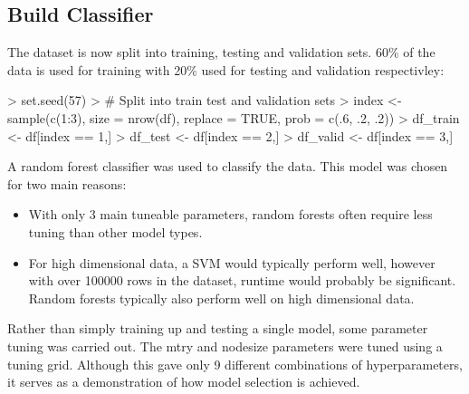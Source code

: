\documentclass[10pt]{article}
\begin{document}
\subsection{Build Classifier}
The dataset is now split into training, testing and validation sets. 60\% of the data is used for training with 20\% used for testing and validation respectivley:
\begin{Schunk}
\begin{Sinput}
> set.seed(57)
> # Split into train test and validation sets
> index <- sample(c(1:3), size = nrow(df), replace = TRUE, prob = c(.6, .2, .2))
> df_train <- df[index == 1,]
> df_test <- df[index == 2,]
> df_valid <- df[index == 3,]
\end{Sinput}
\end{Schunk}

A random forest classifier was used to classify the data. This model was chosen for two main reasons:
\begin{itemize}
  \item With only 3 main tuneable parameters, random forests often require less tuning than other model types.
  \item For high dimensional data, a SVM would typically perform well, however with over 100000 rows in the dataset, runtime would probably be significant. Random forests typically also perform well on high dimensional data. \cite{GENUER201728}
\end{itemize}


Rather than simply training up and testing a single model, some parameter tuning was carried out. The mtry and nodesize parameters were tuned using a tuning grid. Although this gave only 9 different combinations of hyperparameters, it serves as a demonstration of how model selection is achieved.
\end{document}
